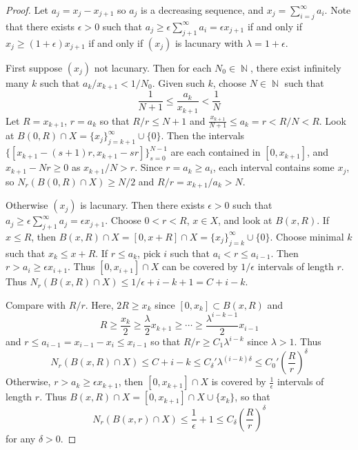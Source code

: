 \documentclass[11pt, a4paper]{memoir}
\DeclareMathOperator{\N}{{\mathbb{N}}}
\theoremstyle{change}
\theoremstyle{plain}
\theoremstyle{nonumberplain}
\newtheorem{proof}{Proof}
\numberwithin{equation}{section}
\begin{document}
\begin{proof}
    Let $a_j=x_j-x_{j+1}$ so $a_j$ is a decreasing sequence, and $x_j=\sum_{i=j}^\infty a_i$.
    Note that there exists $\epsilon>0$ such that $a_j\geq\epsilon\sum_{j+1}^\infty a_i=\epsilon x_{j+1}$ if and only if $x_j\geq(1+\epsilon)x_{j+1}$ if and only if $(x_j)$ is lacunary with $\lambda=1+\epsilon$.

    First suppose $(x_j)$ not lacunary.
    Then for each $N_0\in\N$, there exist infinitely many $k$ such that $a_k/x_{k+1}<1/N_0$.
    Given such $k$, choose $N\in\N$ such that
    \begin{equation*}
        \frac{1}{N+1}\leq\frac{a_k}{x_{k+1}}<\frac{1}{N}
    \end{equation*}
    Let $R=x_{k+1}$, $r=a_k$ so that $R/r\leq N+1$ and $\frac{x_{k+1}}{N+1}\leq a_k=r<R/N<R$.
    Look at $B(0,R)\cap X=\{x_j\}_{j=k+1}^\infty\cup\{0\}$.
    Then the intervals $\{[x_{k+1}-(s+1)r,x_{k+1}-sr]\}_{s=0}^{N-1}$ are each contained in $[0,x_{k+1}]$, and $x_{k+1}-Nr\geq 0$ as $x_{k+1}/N>r$.
    Since $r=a_k\geq a_i$, each interval contains some $x_j$, so $N_r(B(0,R)\cap X)\geq N/2$ and $R/r=x_{k+1}/a_k>N$.

    Otherwise $(x_j)$ is lacunary.
    Then there exists $\epsilon>0$ such that $a_j\geq\epsilon\sum_{j+1}^\infty a_j=\epsilon x_{j+1}$.
    Choose $0<r<R$, $x\in X$, and look at $B(x,R)$.
    If $x\leq R$, then $B(x,R)\cap X=[0,x+R]\cap X=\{x_j\}_{j=k}^\infty\cup\{0\}$.
    Choose minimal $k$ such that $x_k\leq x+R$.
    If $r\leq a_k$, pick $i$ such that $a_i<r\leq a_{i-1}$.
    Then $r>a_i\geq\epsilon x_{i+1}$.
    Thus $[0,x_{i+1}]\cap X$ can be covered by $1/\epsilon$ intervals of length $r$.
    Thus $N_r(B(x,R)\cap X)\leq 1/\epsilon+i-k+1=C+i-k$.

    Compare with $R/r$.
    Here, $2R\geq x_k$ since $[0,x_k]\subset B(x,R)$ and
    \begin{equation*}
        R\geq\frac{x_k}{2}\geq\frac{\lambda}{2}x_{k+1}\geq\cdots\geq\frac{\lambda^{i-k-1}}{2}x_{i-1}
    \end{equation*}
    and $r\leq a_{i-1}=x_{i-1}-x_i\leq x_{i-1}$ so that $R/r\geq C_1\lambda^{i-k}$ since $\lambda>1$.
    Thus
    \begin{equation*}
        N_r(B(x,R)\cap X)\leq C+i-k\leq C_\delta'\lambda^{(i-k)\delta}\leq C_0'\left(\frac{R}{r}\right)^\delta
    \end{equation*}
    Otherwise, $r>a_k\geq\epsilon x_{k+1}$, then $[0,x_{k+1}]\cap X$ is covered by $\frac{1}{\epsilon}$ intervals of length $r$.
    Thus $B(x,R)\cap X=[0,x_{k+1}]\cap X\cup\{x_k\}$, so that
    \begin{equation*}
        N_r(B(x,r)\cap X)\leq\frac{1}{\epsilon}+1\leq C_\delta\left(\frac{R}{r}\right)^\delta
    \end{equation*}
    for any $\delta>0$.


\end{proof}
\end{document}
